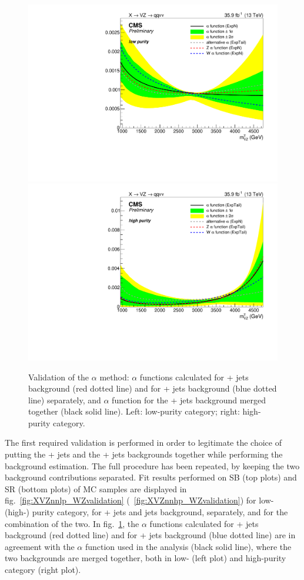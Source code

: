 \begin{figure}[!htb]
  \centering
    \includegraphics[width=.495\textwidth]{plotsAlpha_tesi/XVZnnlp/FourAlphaRatio.pdf}
    \includegraphics[width=.495\textwidth]{plotsAlpha_tesi/XVZnnhp/FourAlphaRatio.pdf}
  \caption{Validation of the $\alpha$ method: $\alpha$ functions calculated for \Z + jets background (red dotted line) and for \W + jets background (blue dotted line) separately, and $\alpha$ function for the \V + jets background merged together (black solid line). Left: low-purity category; right: high-purity category.}
  \label{fig:XVZnn_WZvalidation}
\end{figure}

The first required validation is performed in order to legitimate the choice of putting the \Z + jets and the \W + jets backgrounds together while performing the background estimation. The full procedure has been repeated, by keeping the two background contributions separated. Fit results performed on SB (top plots) and SR (bottom plots) of MC samples are displayed in fig.~\ref{fig:XVZnnlp_WZvalidation} (~\ref{fig:XVZnnhp_WZvalidation}) for low- (high-) purity category, for \Z + jets and \W jets background, separately, and for the combination of the two. In fig.~\ref{fig:XVZnn_WZvalidation}, the $\alpha$ functions calculated for \Z + jets background (red dotted line) and for \W + jets background (blue dotted line) are in agreement with the $\alpha$ function used in the analysis (black solid line), where the two backgrounds are merged together, both in low- (left plot) and high-purity category (right plot).


